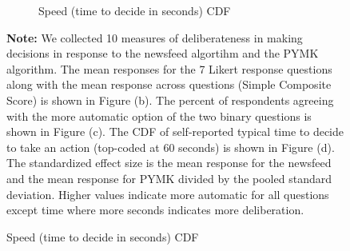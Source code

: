 \documentclass[12pt,letterpaper]{article}
\begin{document}
\begin{figure}
\begin{subfigure}{.5\textwidth}
        \caption{Speed (time to decide in seconds) CDF}
        \label{fig:auto_cdf}
    \end{subfigure}
\label{fig:auto}
\footnotesize \textbf{Note:} We collected 10 measures of deliberateness in making decisions in response to the newsfeed algortihm and the PYMK algorithm. The mean responses for the 7 Likert response questions along with the mean response across questions (Simple Composite Score) is shown in Figure (b).  The percent of respondents agreeing with the more automatic option of the two binary questions is shown in Figure (c). The CDF of self-reported typical time to decide to take an action (top-coded at 60 seconds) is shown in Figure (d). The standardized effect size is the mean response for the newsfeed and the mean response for PYMK divided by the pooled standard deviation. Higher values indicate more automatic for all questions except time where more seconds indicates more deliberation.
\end{figure}

    
\end{document}
